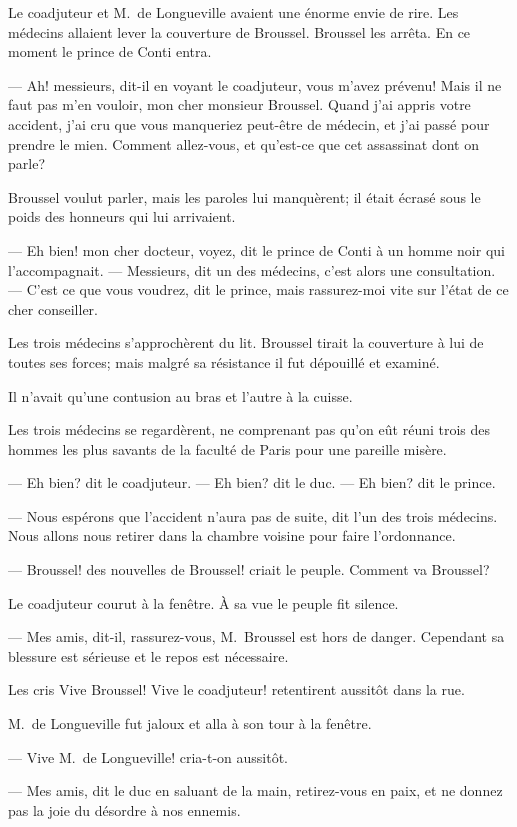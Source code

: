 Le coadjuteur et M.~de Longueville avaient une énorme envie de rire. Les médecins allaient lever la couverture de Broussel. Broussel les arrêta. En ce moment le prince de Conti entra.

— Ah! messieurs, dit-il en voyant le coadjuteur, vous m'avez prévenu! Mais il ne faut pas m'en vouloir, mon cher monsieur Broussel. Quand j'ai appris votre accident, j'ai cru que vous manqueriez peut-être de médecin, et j'ai passé pour prendre le mien. Comment allez-vous, et qu'est-ce que cet assassinat dont on parle?

Broussel voulut parler, mais les paroles lui manquèrent; il était écrasé sous le poids des honneurs qui lui arrivaient.

— Eh bien! mon cher docteur, voyez, dit le prince de Conti à un homme noir qui l'accompagnait. — Messieurs, dit un des médecins, c'est alors une consultation. — C'est ce que vous voudrez, dit le prince, mais rassurez-moi vite sur l'état de ce cher conseiller.

Les trois médecins s'approchèrent du lit. Broussel tirait la couverture à lui de toutes ses forces; mais malgré sa résistance il fut dépouillé et examiné.

Il n'avait qu'une contusion au bras et l'autre à la cuisse.

Les trois médecins se regardèrent, ne comprenant pas qu'on eût réuni trois des hommes les plus savants de la faculté de Paris pour une pareille misère.

— Eh bien? dit le coadjuteur. — Eh bien? dit le duc. — Eh bien? dit le prince.

— Nous espérons que l'accident n'aura pas de suite, dit l'un des trois médecins. Nous allons nous retirer dans la chambre voisine pour faire l'ordonnance.

— Broussel! des nouvelles de Broussel! criait le peuple. Comment va Broussel?

Le coadjuteur courut à la fenêtre. À sa vue le peuple fit silence.

— Mes amis, dit-il, rassurez-vous, M.~Broussel est hors de danger. Cependant sa blessure est sérieuse et le repos est nécessaire.

Les cris Vive Broussel! Vive le coadjuteur! retentirent aussitôt dans la rue.

M.~de Longueville fut jaloux et alla à son tour à la fenêtre.

— Vive M.~de Longueville! cria-t-on aussitôt.

— Mes amis, dit le duc en saluant de la main, retirez-vous en paix, et ne donnez pas la joie du désordre à nos ennemis.

